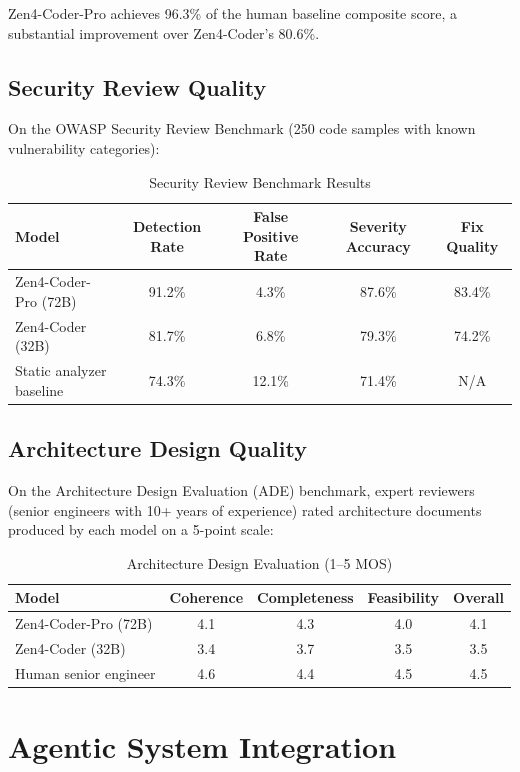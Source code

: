 \documentclass[11pt,a4paper]{article}
\begin{document}
Zen4-Coder-Pro achieves 96.3\% of the human baseline composite score, a substantial improvement over Zen4-Coder's 80.6\%.

\subsection{Security Review Quality}

On the OWASP Security Review Benchmark (250 code samples with known vulnerability categories):

\begin{table}[H]
\centering
\caption{Security Review Benchmark Results}
\begin{tabular}{lcccc}
\toprule
\textbf{Model} & \textbf{Detection Rate} & \textbf{False Positive Rate} & \textbf{Severity Accuracy} & \textbf{Fix Quality} \\
\midrule
Zen4-Coder-Pro (72B) & 91.2\% & 4.3\% & 87.6\% & 83.4\% \\
Zen4-Coder (32B) & 81.7\% & 6.8\% & 79.3\% & 74.2\% \\
Static analyzer baseline & 74.3\% & 12.1\% & 71.4\% & N/A \\
\bottomrule
\end{tabular}
\end{table}

\subsection{Architecture Design Quality}

On the Architecture Design Evaluation (ADE) benchmark, expert reviewers (senior engineers with 10+ years of experience) rated architecture documents produced by each model on a 5-point scale:

\begin{table}[H]
\centering
\caption{Architecture Design Evaluation (1--5 MOS)}
\begin{tabular}{lcccc}
\toprule
\textbf{Model} & \textbf{Coherence} & \textbf{Completeness} & \textbf{Feasibility} & \textbf{Overall} \\
\midrule
Zen4-Coder-Pro (72B) & 4.1 & 4.3 & 4.0 & 4.1 \\
Zen4-Coder (32B) & 3.4 & 3.7 & 3.5 & 3.5 \\
Human senior engineer & 4.6 & 4.4 & 4.5 & 4.5 \\
\bottomrule
\end{tabular}
\end{table}

\section{Agentic System Integration}
\end{document}
